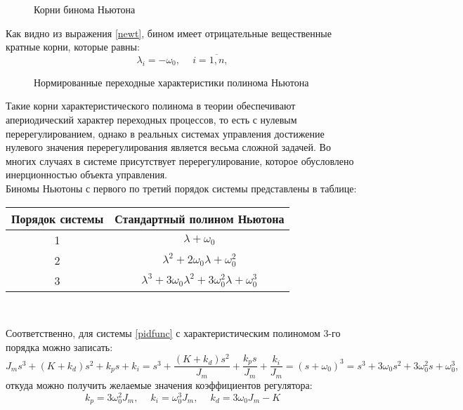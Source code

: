 \begin{figure}[h]
	\noindent{}
	\caption{Корни бинома Ньютона}
\end{figure}

Как видно из выражения \eqref{newt}, бином имеет отрицательные вещественные кратные корни, которые равны:
\begin{equation}
	\lambda_i=-\omega_0, \phantom{-}i=\overline{1,n},
\end{equation}

\begin{figure}[h]
	\noindent{}
	\caption{Нормированные переходные характеристики полинома Ньютона}
	\label{newgraph}
\end{figure}

Такие корни характеристического полинома в теории обеспечивают апериодический характер переходных процессов, то есть с нулевым перерегулированием, однако в реальных системах управления достижение нулевого значения перерегулирования является весьма сложной задачей. Во многих случаях в системе присутствует перерегулирование, которое обусловлено инерционностью объекта управления.\\

Биномы Ньютоны с первого по третий порядок системы представлены в таблице:
\begin{center}
\begin{tabular}{ |c|c| } 
 \hline
 Порядок системы &  Стандартный полином Ньютона \\ 
 \hline
 1 & $\lambda+\omega_0$ \\ 
 \hline
 2 & $\lambda^2+2\omega_0\lambda+\omega_0^2$ \\ 
 \hline
 3 & $\lambda^3+3\omega_0\lambda^2+3\omega_0^2\lambda+\omega_0^3$ \\ 
 \hline
\end{tabular}\\
\end{center}

Соответственно, для системы \eqref{pidfunc} с характеристическим полиномом 3-го порядка можно записать:
\begin{equation}
	J_ms^3+(K+k_d)s^2+k_ps+k_i = s^3+\frac{(K+k_d)s^2}{J_m}+\frac{k_ps}{J_m} +\frac{k_i}{J_m} =(s+\omega_0)^3= s^3+3\omega_0s^2+3\omega_0^2s+\omega_0^3,
\end{equation}
откуда можно получить желаемые значения коэффициентов регулятора:
\begin{equation}
	k_p = 3\omega_0^2J_m, \phantom{- }k_i = \omega_0^3J_m, \phantom{- } k_d=3\omega_0J_m - K
\end{equation}

